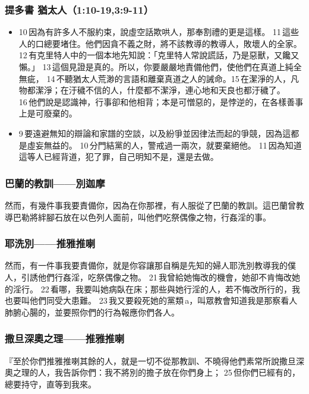 \subsubsection{提多書  猶太人（1:10-19,3:9-11） } 
  \begin{itemize}
 \itemsep-.25em
\item  10 因為有許多人不服約束，說虛空話欺哄人，那奉割禮的更是這樣。 11 這些人的口總要堵住。他們因貪不義之財，將不該教導的教導人，敗壞人的全家。 12 有克里特人中的一個本地先知說：「克里特人常說謊話，乃是惡獸，又饞又懶。」 13 這個見證是真的。所以，你要嚴嚴地責備他們，使他們在真道上純全無疵， 14 不聽猶太人荒渺的言語和離棄真道之人的誡命。15 在潔淨的人，凡物都潔淨；在汙穢不信的人，什麼都不潔淨，連心地和天良也都汙穢了。 16 他們說是認識神，行事卻和他相背；本是可憎惡的，是悖逆的，在各樣善事上是可廢棄的。
 \item  9 要遠避無知的辯論和家譜的空談，以及紛爭並因律法而起的爭競，因為這都是虛妄無益的。 10 分門結黨的人，警戒過一兩次，就要棄絕他。 11 因為知道這等人已經背道，犯了罪，自己明知不是，還是去做。
 \end{itemize}  
    
 \subsubsection{巴蘭的教訓——別迦摩}
 然而，有幾件事我要責備你，因為在你那裡，有人服從了巴蘭的教訓。這巴蘭曾教導巴勒將絆腳石放在以色列人面前，叫他們吃祭偶像之物，行姦淫的事。
 
 \subsubsection{耶洗別——推雅推喇}
 然而，有一件事我要責備你，就是你容讓那自稱是先知的婦人耶洗別教導我的僕人，引誘他們行姦淫，吃祭偶像之物。 21 我曾給她悔改的機會，她卻不肯悔改她的淫行。 22 看哪，我要叫她病臥在床；那些與她行淫的人，若不悔改所行的，我也要叫他們同受大患難。 23 我又要殺死她的黨類 a，叫眾教會知道我是那察看人肺腑心腸的，並要照你們的行為報應你們各人。
 
 \subsubsection{撒旦深奧之理——推雅推喇} 
 『至於你們推雅推喇其餘的人，就是一切不從那教訓、不曉得他們素常所說撒旦深奧之理的人，我告訴你們：我不將別的擔子放在你們身上； 25 但你們已經有的，總要持守，直等到我來。
 

